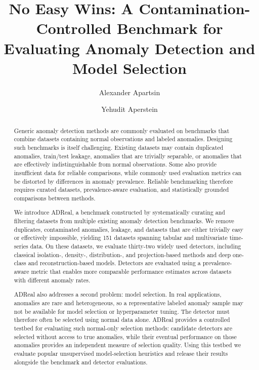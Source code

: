 \documentclass[3p,twocolumn]{elsarticle}
\begin{document}
\begin{frontmatter}
\title{\vspace*{-2\baselineskip}No Easy Wins: A Contamination-Controlled Benchmark for Evaluating Anomaly Detection and Model Selection}

\author[hit]{Alexander Apartsin}
\author[afeka]{Yehudit Aperstein}
\address[hit]{School of Computer Science, Faculty of Sciences, Holon Institute of Technology (HIT), Holon, Israel}
\address[afeka]{Intelligent Systems, Afeka Academic College of Engineering, Tel-Aviv, Israel}

\begin{abstract}
Generic anomaly detection methods are commonly evaluated on benchmarks that combine datasets containing normal observations and labeled anomalies. Designing such benchmarks is itself challenging. Existing datasets may contain duplicated anomalies, train/test leakage, anomalies that are trivially separable, or anomalies that are effectively indistinguishable from normal observations. Some also provide insufficient data for reliable comparisons, while commonly used evaluation metrics can be distorted by differences in anomaly prevalence. Reliable benchmarking therefore requires curated datasets, prevalence-aware evaluation, and statistically grounded comparisons between methods.

We introduce ADReal, a benchmark constructed by systematically curating and filtering datasets from multiple existing anomaly detection benchmarks. We remove duplicates, contaminated anomalies, leakage, and datasets that are either trivially easy or effectively impossible, yielding 151 datasets spanning tabular and multivariate time-series data. On these datasets, we evaluate thirty-two widely used detectors, including classical isolation-, density-, distribution-, and projection-based methods and deep one-class and reconstruction-based models. Detectors are evaluated using a prevalence-aware metric that enables more comparable performance estimates across datasets with different anomaly rates.

ADReal also addresses a second problem: model selection. In real applications, anomalies are rare and heterogeneous, so a representative labeled anomaly sample may not be available for model selection or hyperparameter tuning. The detector must therefore often be selected using normal data alone. ADReal provides a controlled testbed for evaluating such normal-only selection methods: candidate detectors are selected without access to true anomalies, while their eventual performance on those anomalies provides an independent measure of selection quality. Using this testbed we evaluate popular unsupervised model-selection heuristics and release their results alongside the benchmark and detector evaluations.


\end{abstract}
\end{frontmatter}
\end{document}

